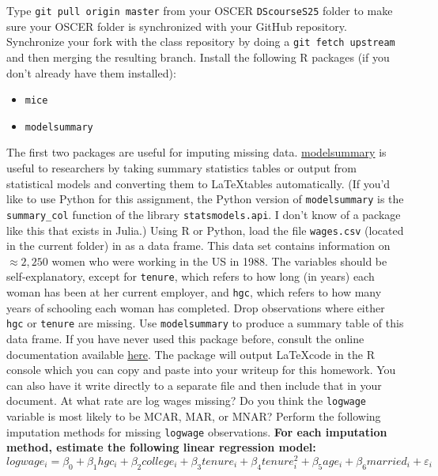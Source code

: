 \documentclass[12pt,english]{exam}
\begin{document}
\begin{questions}
\question Type \texttt{git pull origin master} from your OSCER \texttt{DScourseS25} folder to make sure your OSCER folder is synchronized with your GitHub repository. 
\question Synchronize your fork with the class repository by doing a \texttt{git fetch upstream} and then merging the resulting branch. 
\question Install the following R packages (if you don't already have them installed):
\begin{itemize}
    \item \texttt{mice}
    \item \texttt{modelsummary}
\end{itemize}
The first two packages are useful for imputing missing data.
\href{https://vincentarelbundock.github.io/modelsummary/}{modelsummary} is useful to researchers by taking summary statistics tables or output from statistical models and converting them to \LaTeX tables automatically. (If you'd like to use Python for this assignment, the Python version of \texttt{modelsummary} is the \texttt{summary\_col} function of the library \texttt{statsmodels.api}. I don't know of a package like this that exists in Julia.)
\question Using R or Python, load the file \texttt{wages.csv} (located in the current folder) in as a data frame. This data set contains information on $\approx 2,250$ women who were working in the US in 1988. The variables should be self-explanatory, except for \texttt{tenure}, which refers to how long (in years) each woman has been at her current employer, and \texttt{hgc}, which refers to how many years of schooling each woman has completed.
\question Drop observations where either \texttt{hgc} or \texttt{tenure} are missing.
\question Use \texttt{modelsummary} to produce a summary table of this data frame.
If you have never used this package before, consult the online documentation available \href{https://vincentarelbundock.github.io/modelsummary/}{here}. The package will output \LaTeX code in the R console which you can copy and paste into your writeup for this homework. You can also have it write directly to a separate file and then include that in your document.
At what rate are log wages missing? Do you think the \texttt{logwage} variable is most likely to be MCAR, MAR, or MNAR?
\question Perform the following imputation methods for missing \texttt{logwage} observations. \textbf{For each imputation method, estimate the following linear regression model:}
\[
    logwage_{i} = \beta_{0} +  \beta_{1}hgc_{i} + \beta_{2}college_{i} + \beta_{3}tenure_{i} + \beta_{4}tenure^{2}_{i} + \beta_{5}age_{i} + \beta_{6}married_{i} + \varepsilon_{i}
\]
\end{questions}
\end{document}
